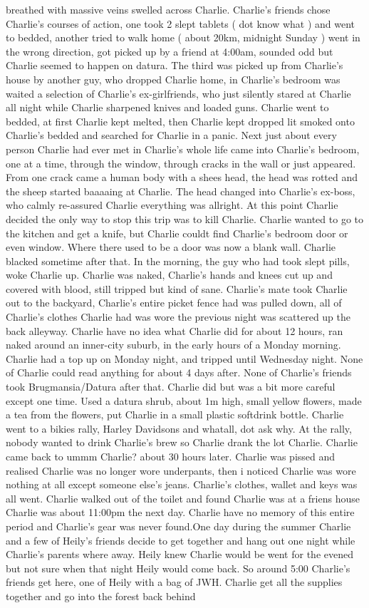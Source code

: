 \documentclass[12pt]{book}
\begin{document}
breathed with massive veins swelled across Charlie. Charlie's friends chose Charlie's courses of action, one took 2 slept tablets ( dot know what ) and went to bedded, another tried to walk home (  about 20km, midnight Sunday ) went in the wrong direction, got picked up by a friend at 4:00am, sounded odd but Charlie seemed to happen on datura. The third was picked up from Charlie's house by another guy, who dropped Charlie home, in Charlie's bedroom was waited a selection of Charlie's ex-girlfriends, who just silently stared at Charlie all night while Charlie sharpened knives and loaded guns. Charlie went to bedded, at first Charlie kept melted, then Charlie kept dropped lit smoked onto Charlie's bedded and searched for Charlie in a panic. Next just about every person Charlie had ever met in Charlie's whole life came into Charlie's bedroom, one at a time, through the window, through cracks in the wall or just appeared. From one crack came a human body with a shees head, the head was rotted and the sheep started baaaaing at Charlie. The head changed into Charlie's ex-boss, who calmly re-assured Charlie everything was allright. At this point Charlie decided the only way to stop this trip was to kill Charlie. Charlie wanted to go to the kitchen and get a knife, but Charlie couldt find Charlie's bedroom door or even window. Where there used to be a door was now a blank wall. Charlie blacked sometime after that. In the morning, the guy who had took slept pills, woke Charlie up. Charlie was naked, Charlie's hands and knees cut up and covered with blood, still tripped but kind of sane. Charlie's mate took Charlie out to the backyard, Charlie's entire picket fence had was pulled down, all of Charlie's clothes Charlie had was wore the previous night was scattered up the back alleyway. Charlie have no idea what Charlie did for about 12 hours, ran naked around an inner-city suburb, in the early hours of a Monday morning. Charlie had a top up on Monday night, and tripped until Wednesday night. None of Charlie could read anything for about 4 days after. None of Charlie's friends took Brugmansia/Datura after that. Charlie did but was a bit more careful except one time. Used a datura shrub, about 1m high, small yellow flowers, made a tea from the flowers, put Charlie in a small plastic softdrink bottle. Charlie went to a bikies rally, Harley Davidsons and whatall, dot ask why. At the rally, nobody wanted to drink Charlie's brew so Charlie drank the lot Charlie. Charlie came back to ummm Charlie? about 30 hours later. Charlie was pissed and realised Charlie was no longer wore underpants, then i noticed Charlie was wore nothing at all except someone else's jeans. Charlie's clothes, wallet and keys was all went. Charlie walked out of the toilet and found Charlie was at a friens house Charlie was about 11:00pm the next day. Charlie have no memory of this entire period and Charlie's gear was never found.One day during the summer Charlie and a few of Heily's friends decide to get together and hang out one night while Charlie's parents where away. Heily knew Charlie would be went for the evened but not sure when that night Heily would come back. So around 5:00 Charlie's friends get here, one of Heily with a bag of JWH. Charlie get all the supplies together and go into the forest back behind 
\end{document}

